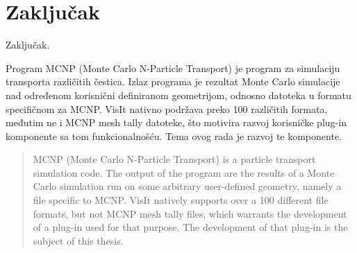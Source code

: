 \documentclass[times, utf8, zavrsni]{fer}
\begin{document}
\chapter{Zaključak}
Zaključak.




\begin{sazetak}
Program MCNP (Monte Carlo N-Particle Transport) je program za simulaciju transporta različitih čestica.
Izlaz programa je rezultat Monte Carlo simulacije nad određenom korisnični definiranom geometrijom, odnosno datoteka u formatu specifičnom za MCNP.
VisIt nativno podržava preko 100 različitih formata, međutim ne i MCNP mesh tally datoteke, što motivira razvoj korisničke plug-in komponente sa tom funkcionalnošću.
Tema ovog rada je razvoj te komponente.

\end{sazetak}

\begin{abstract}
MCNP (Monte Carlo N-Particle Transport) is a particle transport simulation code.
The output of the program are the results of a Monte Carlo simulation run on some arbitrary user-defined geometry, namely a file specific to MCNP.
VisIt natively supports over a 100 different file formats, but not MCNP mesh tally files, which warrants the development of a plug-in used for that purpose.
The development of that plug-in is the subject of this thesis. 

\end{abstract}
\end{document}
